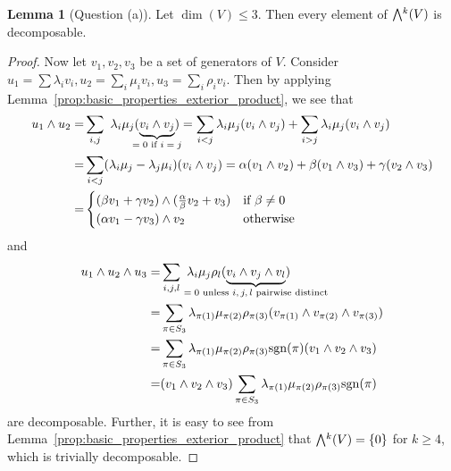 \documentclass{scrartcl}
\newcommand{\sgn}{\mathrm{sgn}}
\newcommand{\extpow}{\mathchoice{{\textstyle\bigwedge}}
    {{\bigwedge}}
    {{\textstyle\wedge}}
    {{\scriptstyle\wedge}}}
\theoremstyle{definition}
\newtheorem{lemma}[subsection]{Lemma}
\begin{document}
\begin{lemma}[Question (a)]
    Let $\dim(V) \leq 3$. Then every element of $\extpow^k(V)$ is decomposable.
\end{lemma}
\begin{proof}
    Now let $v_1, v_2, v_3$ be a set of generators of $V$.
    Consider $u_1 = \sum \lambda_i v_i, u_2 = \sum_i \mu_i v_i, u_3 = \sum_i \rho_i v_i$.
    Then by applying Lemma~\ref{prop:basic_properties_exterior_product}, we see that 
    \begin{align*}
        u_1 \wedge u_2 =& \sum_{i, j} \ \lambda_i \mu_j (\underbrace{v_i \wedge v_j}_{\mathclap{\text{$= 0$ if $i = j$}}}) = \sum_{i < j} \lambda_i \mu_j (v_i \wedge v_j) + \sum_{i > j} \lambda_i \mu_j (v_i \wedge v_j) \\
        =& \sum_{i < j} (\lambda_i \mu_j - \lambda_j \mu_i)(v_i \wedge v_j) = \alpha (v_1 \wedge v_2) + \beta (v_1 \wedge v_3) + \gamma (v_2 \wedge v_3) \\
        =& \begin{cases}
            (\beta v_1 + \gamma v_2) \wedge (\frac \alpha \beta v_2 + v_3) & \text{if $\beta \neq 0$} \\
            (\alpha v_1 - \gamma v_3) \wedge v_2 & \text{otherwise}
        \end{cases}
    \end{align*}
    and
    \begin{align*}
        u_1 \wedge u_2 \wedge u_3 =& \sum_{i, j, l} \ \lambda_i \mu_j \rho_l (\underbrace{v_i \wedge v_j \wedge v_l}_{\mathclap{\text{$= 0$ unless $i, j, l$ pairwise distinct}}}) \\
        =& \sum_{\pi \in S_3} \lambda_{\pi(1)} \mu_{\pi(2)} \rho_{\pi(3)} (v_{\pi(1)} \wedge v_{\pi(2)} \wedge v_{\pi(3)}) \\
        =& \sum_{\pi \in S_3} \lambda_{\pi(1)} \mu_{\pi(2)} \rho_{\pi(3)} \sgn(\pi) (v_1 \wedge v_2 \wedge v_3) \\
        =& (v_1 \wedge v_2 \wedge v_3) \sum_{\pi \in S_3} \lambda_{\pi(1)} \mu_{\pi(2)} \rho_{\pi(3)} \sgn(\pi)
    \end{align*}
    are decomposable.
    Further, it is easy to see from Lemma~\ref{prop:basic_properties_exterior_product} that $\extpow^k(V) = \{ 0 \}$ for $k \geq 4$, which is trivially decomposable.
\end{proof}
\end{document}
